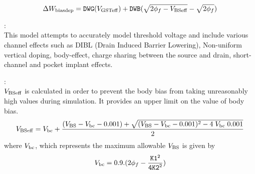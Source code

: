 \documentclass{article}
\begin{document}
\begin{equation}
\Delta W_{\rm{biasdep}} = \texttt{DWG} (V_{\rm{GSTeff}}) +
\texttt{DWB}(\sqrt{2\phi_f - V_{\rm{BSeff}}} - \sqrt{2\phi_f})
\end{equation}

:\\
This model attempts to accurately model threshold voltage and
include various channel effects such as DIBL (Drain Induced
Barrier Lowering), Non-uniform vertical doping, body-effect,
charge sharing between the source and drain, short-channel and
pocket implant effects.

:\\
$V_{\rm{BSeff}}$ is calculated in order to prevent the body bias
from taking unreasonably high values during simulation. It
provides an upper limit on the value of body bias.
\begin{equation}
V_{\rm{BSeff}} = V_{\rm{bc}} + {(V_{\rm{BS}} - V_{\rm{bc}} -
0.001) + \sqrt{(V_{\rm{BS}} - V_{\rm{bc}} - 0.001 )^2 -4 \;
V_{\rm{bc}} \; 0.001} \over 2}
\end{equation}
where $V_{\rm{bc}}$, which represents the maximum allowable
$V_{\rm{BS}}$ is given by
\begin{equation}
V_{\rm{bc}} = 0.9.(2\phi_f - {\tt{K1}^2 \over 4 \tt{K2}^2})
\end{equation}
\end{document}
